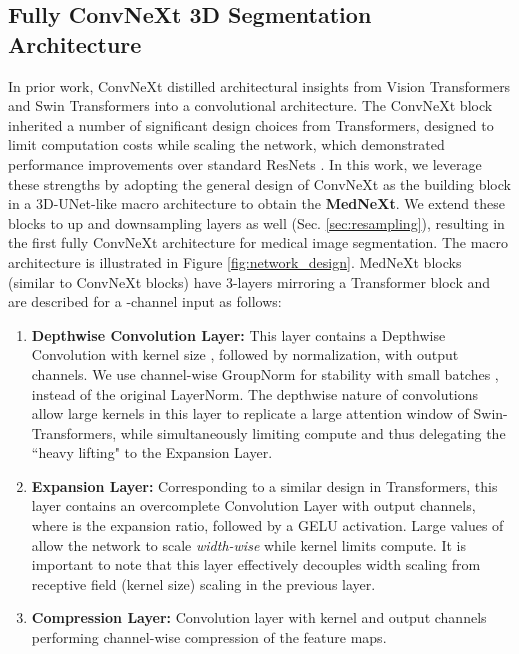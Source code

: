 \documentclass[runningheads]{llncs}
\begin{document}
\subsection{Fully ConvNeXt 3D Segmentation Architecture}
\label{sec:network}
In prior work, ConvNeXt \cite{liu2022convnet} distilled architectural insights from Vision Transformers \cite{dosovitskiy2020image} and Swin Transformers \cite{liu2021swin} into a convolutional architecture. The ConvNeXt block inherited a number of significant design choices from Transformers, designed to limit computation costs while scaling the network, which demonstrated performance improvements over standard ResNets \cite{he2016deep}. 
In this work, we leverage these strengths by adopting the general design of ConvNeXt as the building block in a 3D-UNet-like \cite{cciccek20163d} macro architecture to obtain the \textbf{MedNeXt}. We extend these blocks to up and downsampling layers as well (Sec. \ref{sec:resampling}), resulting in the first fully ConvNeXt architecture for medical image segmentation. The macro architecture is illustrated in Figure \ref{fig:network_design}.
MedNeXt blocks (similar to ConvNeXt blocks) have 3-layers mirroring a Transformer block and are described for a -channel input as follows: 

\begin{enumerate}
    \item \textbf{Depthwise Convolution Layer:} This layer contains a Depthwise Convolution with kernel size , followed by normalization, with  output channels.
    We use channel-wise GroupNorm \cite{wu2018group} for stability with small batches \cite{roy20222}, instead of the original LayerNorm.
The depthwise nature of convolutions allow large kernels in this layer to replicate a large attention window of Swin-Transformers, while simultaneously limiting compute and thus delegating the ``heavy lifting" to the Expansion Layer. 
    \item \textbf{Expansion Layer:} Corresponding to a similar design in Transformers, this layer contains an overcomplete Convolution Layer with  output channels, where  is the expansion ratio, followed by a GELU \cite{hendrycks2016gaussian} activation. Large values of  allow the network to scale \textit{width-wise} while  kernel limits compute. It is important to note that this layer effectively decouples width scaling from receptive field (kernel size) scaling in the previous layer.
    \item \textbf{Compression Layer:} Convolution layer with  kernel and  output channels performing channel-wise compression of the feature maps.
\end{enumerate}
\end{document}
